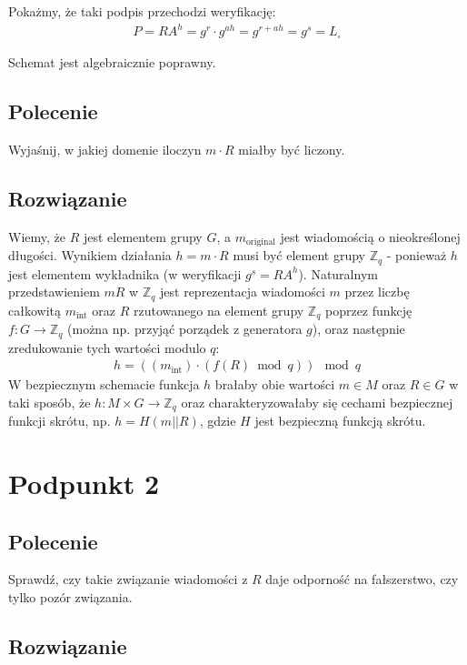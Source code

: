\documentclass{article}
\numberwithin{equation}{subsection}
\begin{document}
\noindent
Pokażmy, że taki podpis przechodzi weryfikację:
\begin{align*}
    P = RA^h = g^r \cdot g^{ah} = g^{r + ah} = g^s = L_{\square}
\end{align*}

\noindent
Schemat jest algebraicznie poprawny.

\subsection{Polecenie}

Wyjaśnij, w jakiej domenie iloczyn $m\cdot R$ miałby być liczony.

\subsection{Rozwiązanie}

Wiemy, że $R$ jest elementem grupy $G$, a $m_{\text{original}}$ jest wiadomością o nieokreślonej długości. 
Wynikiem działania $h=m\cdot R$ musi być element grupy $\mathbb{Z}_q$ - ponieważ $h$ jest elementem wykładnika (w weryfikacji $g^s=RA^h$). 
Naturalnym przedstawieniem $mR$ w $\mathbb{Z}_q$ jest reprezentacja wiadomości $m$ 
przez liczbę całkowitą $m_{\text{int}}$ oraz $R$ rzutowanego na element grupy $\mathbb{Z}_q$ poprzez funkcję $f: G \to \mathbb{Z}_q$ (można np. przyjąć
porządek z generatora $g$), oraz następnie zredukowanie tych wartości modulo $q$:
\begin{align*}
    h = \left((m_{\text{int}}) \cdot (f(R) \bmod q)\right) \mod q
\end{align*}
\noindent
W bezpiecznym schemacie funkcja $h$ brałaby obie wartości $m \in M$ oraz $R\in G$ w taki sposób, że
$h : M \times G \rightarrow \mathbb{Z}_q$ oraz charakteryzowałaby się cechami bezpiecznej funkcji skrótu,
np. $h=H(m||R)$, gdzie $H$ jest bezpieczną funkcją skrótu.

\section{Podpunkt 2}

\subsection{Polecenie}

Sprawdź, czy takie związanie wiadomości z $R$ daje odporność na fałszerstwo, czy tylko pozór związania.

\subsection{Rozwiązanie}
\end{document}
